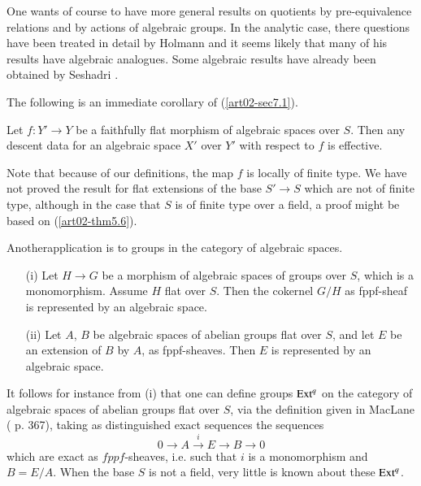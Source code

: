 One wants of course to have more general results on quotients by pre-equivalence relations and by actions of algebraic groups. In the analytic case, there questions have been treated in detail by Holmann \cite{art02-key19} and it seems likely that many of his results have algebraic analogues. Some algebraic results have already been obtained by Seshadri \cite{art02-key33}.

The following is an immediate corollary of (\ref{art02-sec7.1}).

\begin{corollary}\label{art02-coro7.2}
Let $f:Y'\to Y$ be a faithfully flat morphism of algebraic spaces over $S$. Then any descent data for an algebraic space $X'$ over $Y'$ with respect to $f$ is effective.
\end{corollary}

\noindent
Note that because of our definitions, the map $f$ is locally of finite type. We have not proved the result for flat extensions of the base $S'\to S$ which are not of finite type, although in the case that $S$ is of finite type over a field, a proof might be based on (\ref{art02-thm5.6}).

Another\pageoriginale application is to groups in the category of algebraic spaces.

\begin{corollary}\label{coro7.3}
\begin{itemize}
\item[{\rm(i)}] Let $H\to G$ be a morphism of algebraic spaces of groups over $S$, which is a monomorphism. Assume $H$ flat over $S$. Then the cokernel $G/H$ as fppf-sheaf is represented by an algebraic space.

\item[{\rm(ii)}] Let $A$, $B$ be algebraic spaces of abelian groups flat over $S$, and let $E$ be an extension of $B$ by $A$, as fppf-sheaves. Then $E$ is represented by an algebraic space.
\end{itemize}
\end{corollary}

It follows for instance from (i) that one can define groups $\operatorname{\mathrm{Ext}}^{q}$ on the category of algebraic spaces of abelian groups flat over $S$, via the definition given in MacLane (\cite{art02-key22} p. 367), taking as distinguished exact sequences the sequences
$$
0\rightarrow A\xrightarrow{i} E\rightarrow B\rightarrow 0
$$
which are exact as $fppf$-sheaves, i.e. such that $i$ is a monomorphism and $B=E/A$. When the base $S$ is not a field, very little is known about these $\operatorname{\mathrm{Ext}}^{q}$.


